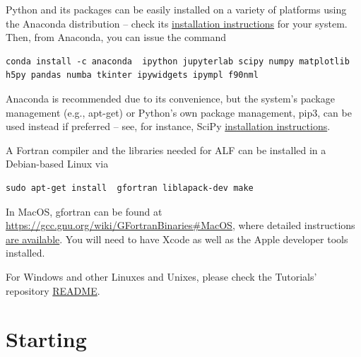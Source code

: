 \documentclass[10pt,modern]{scrartcl}
\numberwithin{exerciseitem}{exercise} %
\newcommand{\ALFver}{2.5}          %
\newcommand{\tutALFver}{2.5}       %
\begin{document}
Python and its packages can be easily installed on a variety of platforms using the Anaconda distribution -- check its \href{https://docs.anaconda.com/anaconda/install/}{installation instructions} for your system. Then, from Anaconda, you can issue the command
\begin{lstlisting}[style=bash]
conda install -c anaconda  ipython jupyterlab scipy numpy matplotlib h5py pandas numba tkinter ipywidgets ipympl f90nml
\end{lstlisting}
Anaconda is recommended due to its convenience, but the system's package management (e.g., apt-get) or Python's own package management, pip3, can be used instead if preferred -- see, for instance, SciPy \href{https://www.scipy.org/install.html}{installation instructions}.

A Fortran compiler and the libraries needed for ALF can be installed in a Debian-based Linux via
\begin{lstlisting}[style=bash]
sudo apt-get install  gfortran liblapack-dev make
\end{lstlisting}
In MacOS, gfortran can be found at \url{https://gcc.gnu.org/wiki/GFortranBinaries#MacOS}, where detailed instructions \href{https://gcc.gnu.org/wiki/GFortranBinariesMacOS}{are available}. You will need to have Xcode as well as the Apple developer tools installed.

For Windows and other Linuxes and Unixes, please check the Tutorials' repository \href{https://git.physik.uni-wuerzburg.de/ALF/ALF_Tutorial/-/blob/master/Tutorial-ALF-\tutALFver/README.md}{README}.

\section*{Starting}
\end{document}
